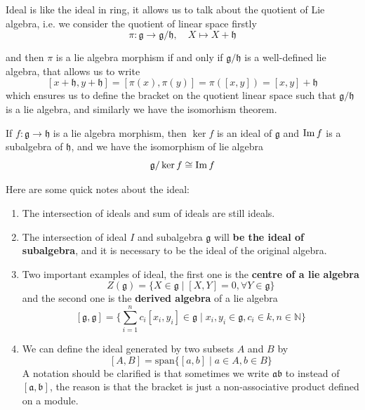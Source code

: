 Ideal is like the ideal in ring, it allows us to talk about the quotient of Lie algebra, i.e. we consider the quotient of linear space firstly
\[\pi: \mathfrak{g} \to \mathfrak{g}/\mathfrak{h}, \quad X \mapsto X + \mathfrak{h}\]

and then \(\pi\) is a lie algebra morphism if and only if \(\mathfrak{g}/ \mathfrak{h}\) is a well-defined lie algebra, that allows us to write
\[[x + \mathfrak{h}, y + \mathfrak{h}] = [\pi(x),\pi(y)] = \pi([x,y]) = [x,y]+ \mathfrak{h}\]
which ensures us to define the bracket on the quotient linear space such that \(\mathfrak{g}/\mathfrak{h}\) is a lie algebra, and similarly we have the isomorhism theorem.

\begin{theorem}
    If \(f: \mathfrak{g} \to \mathfrak{h}\) is a lie algebra morphism, then \(\ker f\) is an ideal of \(\mathfrak{g}\) and \(\operatorname{Im} f\) is a subalgebra of \(\mathfrak{h}\), and we have the isomorphism of lie algebra
\[\mathfrak{g}/\ker f \cong \operatorname{Im} f\]
\end{theorem}

\begin{remark}
    Here are some quick notes about the ideal:
    \begin{enumerate}
        \item The intersection of ideals and sum of ideals are still ideals.
        \item The intersection of ideal \(I\) and subalgebra \(\mathfrak{g}\) will \textbf{be the ideal of subalgebra}, and it is necessary to be the ideal of the original algebra.
        \item Two important examples of ideal, the first one is the \textbf{centre of a lie algebra}
        \[Z(\mathfrak{g}) = \{X \in \mathfrak{g} \mid [X,Y] = 0, \forall Y \in \mathfrak{g}\}\]
        and the second one is the \textbf{derived algebra} of a lie algebra
        \[[\mathfrak{g}, \mathfrak{g}] = \{\sum_{i=1}^n c_i[x_i,y_i] \in \mathfrak{g} \mid x_i,y_i \in \mathfrak{g}, c_i \in k, n \in \mathbb{N}\}\]
        \item We can define the ideal generated by two subsets \(A\) and \(B\) by 
        \[[A,B] = \mathrm{span}\{[a,b] \mid a \in A, b \in B\}\]
        A notation should be clarified is that sometimes we write \(\mathfrak{a}\mathfrak{b}\) to instead of \([\mathfrak{a},\mathfrak{b}]\), the reason is that the bracket is just a non-associative product defined on a module.
    \end{enumerate}
\end{remark}

